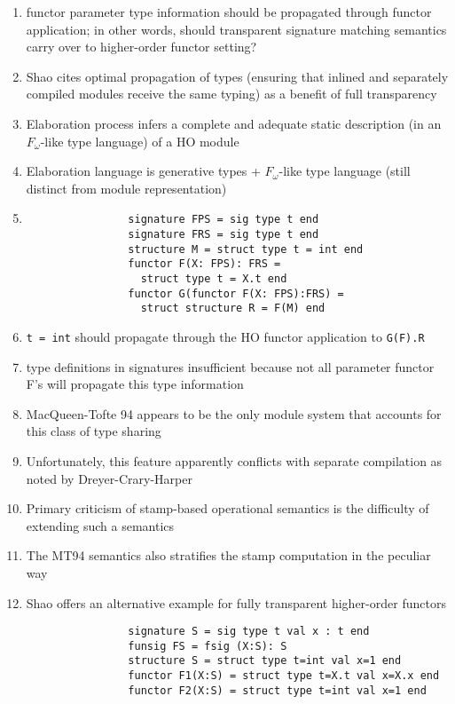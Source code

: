 \documentclass[12pt]{article}
\begin{document}
\begin{enumerate}
\begin{enumerate}
		\begin{enumerate}
			\item functor parameter type information should be propagated through functor application; in other words, should transparent signature matching semantics carry over to higher-order functor setting?
			\item Shao \cite{shao98} cites optimal propagation of types (ensuring that inlined and separately compiled modules receive the same typing) as a benefit of full transparency
			\item Elaboration process infers a complete and adequate static description (in an $F_\omega$-like type language) of a HO module 
			\item Elaboration language is generative types + $F_\omega$-like type language (still distinct from module representation)
			\item \begin{verbatim}
				signature FPS = sig type t end
				signature FRS = sig type t end
				structure M = struct type t = int end
				functor F(X: FPS): FRS = 
				  struct type t = X.t end
				functor G(functor F(X: FPS):FRS) = 
				  struct structure R = F(M) end
			\end{verbatim}
			\item \verb|t = int| should propagate through the HO functor application to \verb|G(F).R|
			\item type definitions in signatures insufficient because not all parameter functor F's will propagate this type information
			\item MacQueen-Tofte 94 appears to be the only module system that accounts for this class of type sharing
			\item Unfortunately, this feature apparently conflicts with separate compilation as noted by Dreyer-Crary-Harper \cite{dhc03}
			\item Primary criticism of stamp-based operational semantics is the difficulty of extending such a semantics
			\item The MT94 semantics also stratifies the stamp computation in the peculiar way 
			\item Shao \cite{shao99} offers an alternative example for fully transparent higher-order functors\\
			\begin{verbatim}
				signature S = sig type t val x : t end
				funsig FS = fsig (X:S): S
				structure S = struct type t=int val x=1 end
				functor F1(X:S) = struct type t=X.t val x=X.x end
				functor F2(X:S) = struct type t=int val x=1 end

\end{verbatim}
\end{enumerate}
\end{enumerate}
\end{enumerate}
\end{document}
